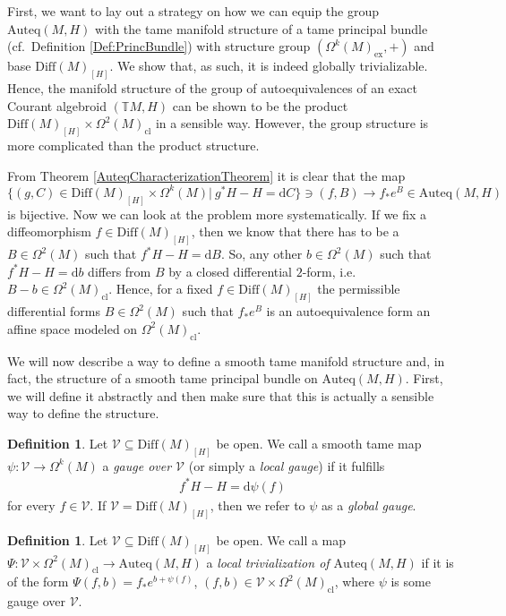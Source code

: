 \documentclass[12pt,a4paper]{article}
\theoremstyle{plain}
\theoremstyle{definition}
\newtheorem{definition}[theorem]{Definition}
\newcommand{\Forms}[1]{\Omega^{#1}(M)}
\newcommand{\ClForms}[1]{\Forms{#1}_{\mathrm{cl}}}
\newcommand{\SDiff}{\mathrm{Diff}(M)_{[H]}}
\newcommand{\Auteq}{\mathrm{Auteq}(M,H)}
\newcommand{\GenTM}{\mathbb TM}
\newcommand{\Vcal}{\mathcal{V}}
\renewcommand{\d}{\mathrm{d}}
\begin{document}
First, we want to lay out a strategy on how we can equip the group $\mathrm{Auteq}(M,H)$ with the tame manifold structure of a tame principal bundle (cf.~Definition \ref{Def:PrincBundle}) with structure group $(\Forms{k}_{\mathrm{ex}},+)$ and base $\SDiff$. We show that, as such, it is indeed globally trivializable. Hence, the manifold structure of the group of autoequivalences of an exact Courant algebroid $(\GenTM,H)$ can be shown to be the product $\SDiff\times \ClForms{2}$ in a sensible way.
However, the group structure is more complicated than the product structure.

From Theorem \ref{AuteqCharacterizationTheorem} it is clear that the map 
$$\{(g,C)\in \SDiff\times \Forms{k}|~g^*H-H=\d C\}\ni (f,B)\to f_* e^B\in \Auteq$$ is bijective.
Now we can look at the problem more systematically. If we fix a diffeomorphism $f\in \SDiff$, then we know that there has to be a $B\in \Forms{2}$ such that $f^*H-H=\d B$. So, any other $b\in \Forms{2}$ such that $f^*H-H=\d b$ differs from $B$ by a closed differential $2$-form, i.e.~$B-b\in \Forms{2}_{\mathrm{cl}}$. Hence, for a fixed $f\in \SDiff$ the permissible differential forms $B\in \Forms{2}$ such that $f_*e^B$ is an autoequivalence form an affine space modeled on $\Forms{2}_{\mathrm{cl}}$.

We will now describe a way to define a smooth tame manifold structure and, in fact, the structure of a smooth tame principal bundle on $\Auteq$. First, we will define it abstractly and then make sure that this is actually a sensible way to define the structure. 

\begin{definition}
\label{gauge}
Let $\Vcal \subseteq \SDiff$ be open. We call a smooth tame map 
$\psi:\Vcal\to \Forms{k}$ a \textit{gauge over $\Vcal$} (or simply a \textit{local gauge}) if it fulfills 
\begin{align*}
    f^*H-H=\d\psi(f)
\end{align*}
for every $f\in \Vcal$. If $\Vcal=\SDiff$, then we refer to $\psi$ as a \textit{global gauge}.
\end{definition}

\begin{definition}
\label{Triv}
Let $\Vcal\subseteq \SDiff$ be open. We call a map $\Psi:\Vcal\times \ClForms{2}\to \Auteq$ a \textit{local trivialization of $\Auteq$} if it is of the form $\Psi(f,b)=f_*e^{b+\psi(f)}$, $(f,b)\in \Vcal\times \ClForms{2}$, where $\psi$ is some gauge over $\Vcal$.
\end{definition}
\end{document}

